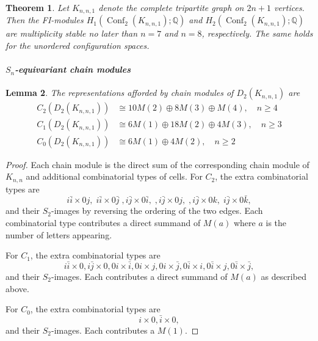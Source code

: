 \documentclass[12pt]{amsart}
\newtheorem{thm}{Theorem}[section]
\newtheorem{lem}[thm]{Lemma}
\theoremstyle{definition}
\newcommand{\Q}{\mathbb{Q}}
\newcommand{\conf}{\operatorname{Conf}}
\begin{document}
\begin{thm} \label{thm: tripartiteBounds}
Let $K_{n,n,1}$ denote the complete tripartite graph on $2n+1$ vertices. Then the FI-modules $H_1(\conf_2(K_{n,n,1});\Q)$ and $H_2(\conf_2(K_{n,n,1});\Q)$ are multiplicity stable no later than $n = 7$ and $n = 8$, respectively. The same holds for the unordered configuration spaces.
\end{thm}


\paragraph{\textit{$S_n$-equivariant chain modules}}
\begin{lem}
The representations afforded by chain modules of $D_2(K_{n,n,1})$ are
\begin{align*}
C_2(D_2(K_{n,n,1})) &\cong 10M(2) \oplus 8M(3) \oplus M(4),\quad n\geq 4\\
C_1(D_2(K_{n,n,1})) &\cong 6M(1) \oplus 18M(2) \oplus 4M(3),\quad n\geq 3
\\
C_0(D_2(K_{n,n,1})) &\cong 6M(1) \oplus 4M(2),\quad n\geq 2 
\end{align*}
\end{lem}

\begin{proof}
Each chain module is the direct sum of the corresponding chain module of $K_{n,n}$ and additional combinatorial types of cells. For $C_2$, the extra combinatorial types are \[i\bar i\times 0j,\; i\bar i\times 0\bar j\;, i\bar j \times 0\bar i,\;,i\bar j \times 0j,\;,i\bar j \times 0k,\; i\bar j \times 0\bar k,\] and their $S_2$-images by reversing the ordering of the two edges. Each combinatorial type contributes a direct summand of $M(a)$ where $a$ is the number of letters appearing.

For $C_1$, the extra combinatorial types are \[i\bar i\times 0,i\bar j \times 0,0i\times \bar i, 0i\times j,0i\times \bar j,0\bar i\times i,0\bar i\times j,0\bar i\times \bar j,\] and their $S_2$-images. Each contributes a direct summand of $M(a)$ as described above.

For $C_0$, the extra combinatorial types are \[i\times0,\bar i\times 0,\] and their $S_2$-images. Each contributes a $M(1)$.
\end{proof}
\end{document}
